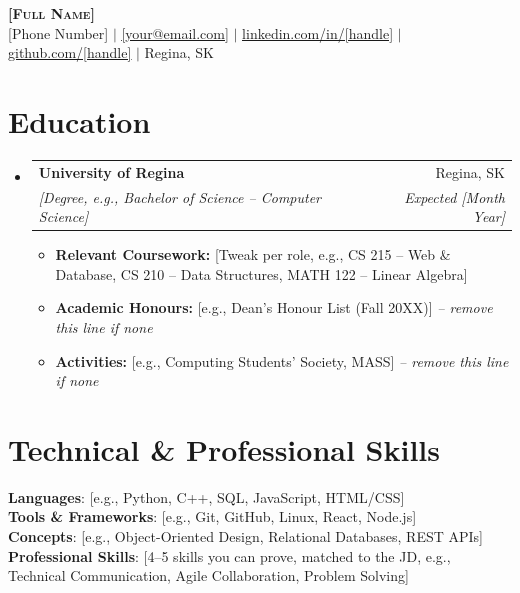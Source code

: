 \documentclass[letterpaper,11pt]{article}
\makeatletter
\newcommand{\resumeItem}[1]{
  \item\small{{#1 \vspace{-2pt}}}
}
\newcommand{\resumeSubheading}[4]{
  \vspace{-2pt}\item
    \begin{tabular*}{0.97\textwidth}[t]{l@{\extracolsep{\fill}}r}
      \textbf{#1} & #2 \\
      \textit{\small#3} & \textit{\small #4} \\
    \end{tabular*}\vspace{-7pt}
}
\newcommand{\resumeSubHeadingListStart}{\begin{itemize}[leftmargin=0.15in, label={}]}
\newcommand{\resumeSubHeadingListEnd}{\end{itemize}}
\newcommand{\resumeItemListStart}{\begin{itemize}}
\newcommand{\resumeItemListEnd}{\end{itemize}\vspace{-5pt}}
\makeatother
\begin{document}
\begin{center}
    \textbf{\Huge \scshape [Full Name]} \\ \vspace{1pt}
    \small
    [Phone Number] $|$
    \href{mailto:[your@email.com]}{\underline{[your@email.com]}} $|$
    \href{https://linkedin.com/in/[handle]}{\underline{linkedin.com/in/[handle]}} $|$
    \href{https://github.com/[handle]}{\underline{github.com/[handle]}} $|$
    Regina, SK
\end{center}


\section{Education}
  \resumeSubHeadingListStart
    \resumeSubheading
      {University of Regina}{Regina, SK}
      {[Degree, e.g., Bachelor of Science -- Computer Science]}{Expected [Month Year]}
      \resumeItemListStart
        \resumeItem{\textbf{Relevant Coursework:} [Tweak per role, e.g., CS 215 -- Web \& Database, CS 210 -- Data Structures, MATH 122 -- Linear Algebra]}
        \resumeItem{\textbf{Academic Honours:} [e.g., Dean's Honour List (Fall 20XX)] \textit{-- remove this line if none}}
        \resumeItem{\textbf{Activities:} [e.g., Computing Students' Society, MASS] \textit{-- remove this line if none}}
      \resumeItemListEnd
  \resumeSubHeadingListEnd


\section{Technical \& Professional Skills}
 \begin{itemize}[leftmargin=0.15in, label={}]
    \small{\item{
     \textbf{Languages}{: [e.g., Python, C++, SQL, JavaScript, HTML/CSS]} \\
     \textbf{Tools \& Frameworks}{: [e.g., Git, GitHub, Linux, React, Node.js]} \\
     \textbf{Concepts}{: [e.g., Object-Oriented Design, Relational Databases, REST APIs]} \\
     \textbf{Professional Skills}{: [4--5 skills you can prove, matched to the JD, e.g., Technical Communication, Agile Collaboration, Problem Solving]}
    }}
 \end{itemize}
\end{document}
